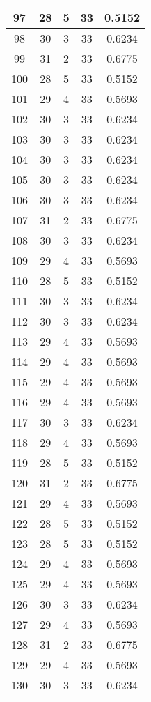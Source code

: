 \documentclass[letterpaper, 12pt]{article}
\begin{document}
\begin{longtable}{|c|c|c|c|c|}
\hline
97 & 28 & 5 & 33 & 0.5152 \\
\hline
98 & 30 & 3 & 33 & 0.6234 \\
\hline
99 & 31 & 2 & 33 & 0.6775 \\
\hline
100 & 28 & 5 & 33 & 0.5152 \\
\hline
101 & 29 & 4 & 33 & 0.5693 \\
\hline
102 & 30 & 3 & 33 & 0.6234 \\
\hline
103 & 30 & 3 & 33 & 0.6234 \\
\hline
104 & 30 & 3 & 33 & 0.6234 \\
\hline
105 & 30 & 3 & 33 & 0.6234 \\
\hline
106 & 30 & 3 & 33 & 0.6234 \\
\hline
107 & 31 & 2 & 33 & 0.6775 \\
\hline
108 & 30 & 3 & 33 & 0.6234 \\
\hline
109 & 29 & 4 & 33 & 0.5693 \\
\hline
110 & 28 & 5 & 33 & 0.5152 \\
\hline
111 & 30 & 3 & 33 & 0.6234 \\
\hline
112 & 30 & 3 & 33 & 0.6234 \\
\hline
113 & 29 & 4 & 33 & 0.5693 \\
\hline
114 & 29 & 4 & 33 & 0.5693 \\
\hline
115 & 29 & 4 & 33 & 0.5693 \\
\hline
116 & 29 & 4 & 33 & 0.5693 \\
\hline
117 & 30 & 3 & 33 & 0.6234 \\
\hline
118 & 29 & 4 & 33 & 0.5693 \\
\hline
119 & 28 & 5 & 33 & 0.5152 \\
\hline
120 & 31 & 2 & 33 & 0.6775 \\
\hline
121 & 29 & 4 & 33 & 0.5693 \\
\hline
122 & 28 & 5 & 33 & 0.5152 \\
\hline
123 & 28 & 5 & 33 & 0.5152 \\
\hline
124 & 29 & 4 & 33 & 0.5693 \\
\hline
125 & 29 & 4 & 33 & 0.5693 \\
\hline
126 & 30 & 3 & 33 & 0.6234 \\
\hline
127 & 29 & 4 & 33 & 0.5693 \\
\hline
128 & 31 & 2 & 33 & 0.6775 \\
\hline
129 & 29 & 4 & 33 & 0.5693 \\
\hline
130 & 30 & 3 & 33 & 0.6234 \\

\end{longtable}
\end{document}
